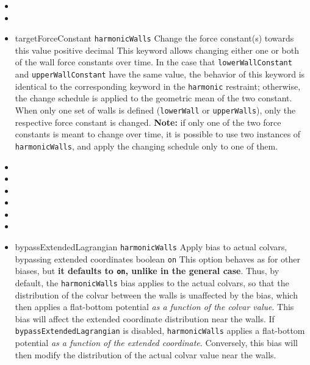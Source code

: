 \begin{itemize}
\item %

\item {}

\item %
  \key
    {targetForceConstant}{%
    \texttt{harmonicWalls}}{%
    Change the force constant(s) towards this value}{%
    positive decimal}{%
    This keyword allows changing either one or both of the wall force constants over time.
    In the case that \texttt{lowerWallConstant} and \texttt{upperWallConstant} have the same value, the behavior of this keyword is identical to the corresponding keyword in the \texttt{harmonic} restraint; otherwise, the change schedule is applied to the geometric mean of the two constant.
    When only one set of walls is defined (\texttt{lowerWall} or \texttt{upperWalls}), only the respective force constant is changed.
    \textbf{Note:} if only one of the two force constants is meant to change over time, it is possible to use two instances of \texttt{harmonicWalls}, and apply the changing schedule only to one of them.
  }

\item {}
\item {}
\item {}
\item {}
\item {}
\item {}

\item %
  \keydef
    {bypassExtendedLagrangian}{%
    \texttt{harmonicWalls}}{%
    Apply bias to actual colvars, bypassing extended coordinates}{%
    boolean}{%
    \texttt{on}}{%
    This option behaves as  for other biases,
    but \textbf{it defaults to \texttt{on}, unlike in the general case}.
    Thus, by default, the \texttt{harmonicWalls} bias applies to the actual colvars, so that the distribution of the colvar between the walls is unaffected by the bias, which then applies a flat-bottom potential \emph{as a function of the colvar value}. This bias will affect the extended coordinate distribution near the walls.
    If \texttt{bypassExtendedLagrangian} is disabled, \texttt{harmonicWalls} applies a flat-bottom potential \emph{as a function of the extended coordinate}. Conversely, this bias will then modify the distribution of the actual colvar value near the walls.}


\end{itemize}

